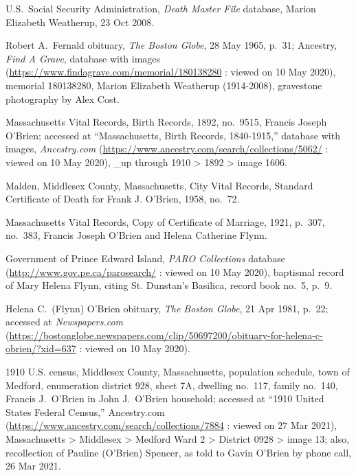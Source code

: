 \begin{thebibliography}{999}
U.S.\ Social Security Administration, \textit{Death Master File} database, Marion Elizabeth Weatherup, 23 Oct 2008.

Robert A.\ Fernald obituary, \textit{The Boston Globe}, 28 May 1965, p.\ 31; Ancestry, \textit{Find A Grave}, database with images (\url{https://www.findagrave.com/memorial/180138280} : viewed on 10 May 2020), memorial 180138280, Marion Elizabeth Weatherup (1914-2008), gravestone photography by Alex Cost.


Massachusetts Vital Records, Birth Records, 1892, no.\ 9515, Francis Joseph O'Brien; accessed at ``Massachusetts, Birth Records, 1840-1915,'' database with images, \textit{Ancestry.com} (\url{https://www.ancestry.com/search/collections/5062/} : viewed on 10 May 2020), \_up through 1910 > 1892 > image 1606.

Malden, Middlesex County, Massachusetts, City Vital Records, Standard Certificate of Death for Frank J. O'Brien, 1958, no.\ 72.

Massachusetts Vital Records, Copy of Certificate of Marriage, 1921, p.\ 307, no.\ 383, Francis Joseph O'Brien and Helena Catherine Flynn.

Government of Prince Edward Island, \textit{PARO Collections} database (\url{http://www.gov.pe.ca/parosearch/} : viewed on 10 May 2020), baptismal record of Mary Helena Flynn, citing St. Dunstan's Basilica, record book no.\ 5, p.\ 9.

Helena C.\ (Flynn) O'Brien obituary, \textit{The Boston Globe}, 21 Apr 1981, p.\ 22; accessed at \textit{Newspapers.com} (\url{https://bostonglobe.newspapers.com/clip/50697200/obituary-for-helena-c-obrien/?xid=637} : viewed on 10 May 2020).

1910 U.S. census, Middlesex County, Massachusetts, population schedule, town of Medford, enumeration district 928, sheet 7A, dwelling no.\ 117, family no.\ 140, Francis J.\ O'Brien in John J.\ O'Brien household; accessed at  ``1910 United States Federal Census,'' Ancestry.com (\url{https://www.ancestry.com/search/collections/7884} : viewed on 27 Mar 2021), Massachusetts > Middlesex > Medford Ward 2 > District 0928 > image 13; also, recollection of Pauline (O'Brien) Spencer, as told to Gavin O'Brien by phone call, 26 Mar 2021.


\end{thebibliography}
